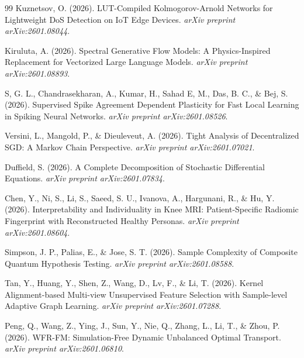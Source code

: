 \documentclass[11pt]{article}
\begin{document}
\begin{thebibliography}{99}
Kuznetsov, O. (2026). LUT-Compiled Kolmogorov-Arnold Networks for Lightweight DoS Detection on IoT Edge Devices. \emph{arXiv preprint arXiv:2601.08044}.

Kiruluta, A. (2026). Spectral Generative Flow Models: A Physics-Inspired Replacement for Vectorized Large Language Models. \emph{arXiv preprint arXiv:2601.08893}.

S, G. L., Chandrasekharan, A., Kumar, H., Sahad E, M., Das, B. C., \& Bej, S. (2026). Supervised Spike Agreement Dependent Plasticity for Fast Local Learning in Spiking Neural Networks. \emph{arXiv preprint arXiv:2601.08526}.

Versini, L., Mangold, P., \& Dieuleveut, A. (2026). Tight Analysis of Decentralized SGD: A Markov Chain Perspective. \emph{arXiv preprint arXiv:2601.07021}.

Duffield, S. (2026). A Complete Decomposition of Stochastic Differential Equations. \emph{arXiv preprint arXiv:2601.07834}.

Chen, Y., Ni, S., Li, S., Saeed, S. U., Ivanova, A., Hargunani, R., \& Hu, Y. (2026). Interpretability and Individuality in Knee MRI: Patient-Specific Radiomic Fingerprint with Reconstructed Healthy Personas. \emph{arXiv preprint arXiv:2601.08604}.

Simpson, J. P., Palias, E., \& Jose, S. T. (2026). Sample Complexity of Composite Quantum Hypothesis Testing. \emph{arXiv preprint arXiv:2601.08588}.

Tan, Y., Huang, Y., Shen, Z., Wang, D., Lv, F., \& Li, T. (2026). Kernel Alignment-based Multi-view Unsupervised Feature Selection with Sample-level Adaptive Graph Learning. \emph{arXiv preprint arXiv:2601.07288}.

Peng, Q., Wang, Z., Ying, J., Sun, Y., Nie, Q., Zhang, L., Li, T., \& Zhou, P. (2026). WFR-FM: Simulation-Free Dynamic Unbalanced Optimal Transport. \emph{arXiv preprint arXiv:2601.06810}.

\end{thebibliography}
\end{document}
